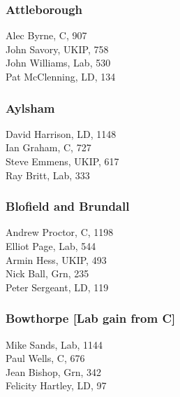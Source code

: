 \documentclass[a4paper,openany,10pt]{book}
\begin{document}
\subsubsection*{Attleborough}



Alec Byrne, C, 907\\
John Savory, UKIP, 758\\
John Williams, Lab, 530\\
Pat McClenning, LD, 134\\


\subsubsection*{Aylsham}



David Harrison, LD, 1148\\
Ian Graham, C, 727\\
Steve Emmens, UKIP, 617\\
Ray Britt, Lab, 333\\


\subsubsection*{Blofield and Brundall}



Andrew Proctor, C, 1198\\
Elliot Page, Lab, 544\\
Armin Hess, UKIP, 493\\
Nick Ball, Grn, 235\\
Peter Sergeant, LD, 119\\


\subsubsection*{Bowthorpe \hspace*{\fill}\nolinebreak[1]%
\enspace\hspace*{\fill}
[Lab gain from C]}



Mike Sands, Lab, 1144\\
Paul Wells, C, 676\\
Jean Bishop, Grn, 342\\
Felicity Hartley, LD, 97\\
\end{document}

